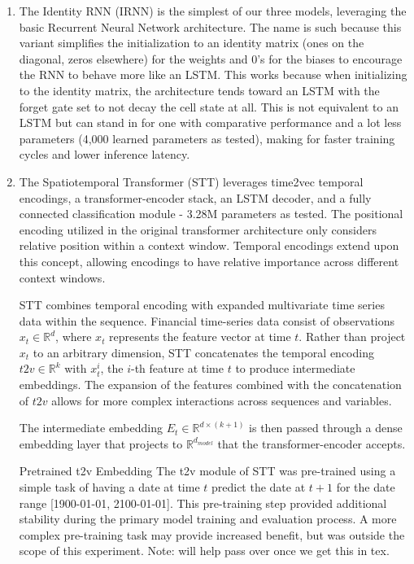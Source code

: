 \documentclass[10pt,twocolumn,letterpaper]{article}
\begin{document}
    \begin{enumerate}
        \item{The Identity RNN (IRNN) is the simplest of our three models, leveraging the basic Recurrent Neural Network architecture. The name is such because this variant simplifies the initialization to an identity matrix (ones on the diagonal, zeros elsewhere) for the weights and 0’s for the biases to encourage the RNN to behave more like an LSTM. This works because when initializing to the identity matrix, the architecture tends toward an LSTM with the forget gate set to not decay the cell state at all. This is not equivalent to an LSTM but can stand in for one with comparative performance and a lot less parameters (4,000 learned parameters as tested), making for faster training cycles and lower inference latency.}
        \item{The Spatiotemporal Transformer (STT) leverages time2vec temporal encodings, a transformer-encoder stack, an LSTM decoder, and a fully connected classification module - 3.28M parameters as tested. The positional encoding utilized in the original transformer architecture only considers relative position within a context window. Temporal encodings extend upon this concept, allowing encodings to have relative importance across different context windows\cite{STT_Paper,time2vec,STLAT_sota,vaswani_attention_2023,BERT}.

STT combines temporal encoding with expanded multivariate time series data within the sequence. Financial time-series data consist of observations $x_t \in \mathbb{R}^d$, where $x_t$ represents the feature vector at time $t$. Rather than project $x_t$ to an arbitrary dimension, STT concatenates the temporal encoding $t2v \in \mathbb{R}^k$ with $x^i_t$, the $i$-th feature at time $t$ to produce intermediate embeddings. The expansion of the features combined with the concatenation of $t2v$ allows for more complex interactions across sequences and variables.

            The intermediate embedding $E_t \in \mathbb{R}^{d \times (k + 1)}$ is then passed through a dense embedding layer that projects to $\mathbb{R}^{d_{model}}$ that the transformer-encoder accepts.

Pretrained t2v Embedding
The t2v module of STT was pre-trained using a simple task of having a date at time $t$ predict the date at $t+1$ for the date range [1900-01-01, 2100-01-01]. This pre-training step provided additional stability during the primary model training and evaluation process. A more complex pre-training task may provide increased benefit, but was outside the scope of this experiment.
            Note: will help pass over once we get this in tex.}


\end{enumerate}
\end{document}

